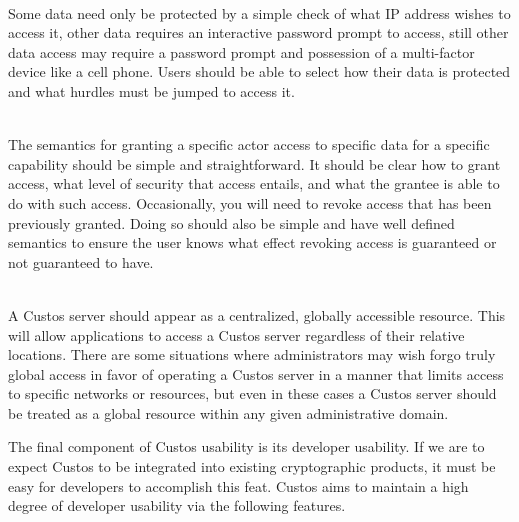 \begin{packed_desc}
\item[Flexible Authentication Mechanisms] \hfill \\ Some data need
  only be protected by a simple check of what IP address wishes to
  access it, other data requires an interactive password prompt to
  access, still other data access may require a password prompt and
  possession of a multi-factor device like a cell phone. Users should
  be able to select how their data is protected and what hurdles must
  be jumped to access it.
\item[Simple Access Control] \hfill \\ The semantics for granting a
  specific actor access to specific data for a specific capability
  should be simple and straightforward. It should be clear how to
  grant access, what level of security that access entails, and what
  the grantee is able to do with such access. Occasionally, you will
  need to revoke access that has been previously granted. Doing so
  should also be simple and have well defined semantics to ensure the
  user knows what effect revoking access is guaranteed or not
  guaranteed to have.
\item[Logical Centralization] \hfill \\ A Custos server should appear
  as a centralized, globally accessible resource. This will allow
  applications to access a Custos server regardless of their relative
  locations. There are some situations where administrators may wish
  forgo truly global access in favor of operating a Custos server in a
  manner that limits access to specific networks or resources, but
  even in these cases a Custos server should be treated as a global
  resource within any given administrative domain.
\end{packed_desc}

The final component of Custos usability is its developer usability. If
we are to expect Custos to be integrated into existing cryptographic
products, it must be easy for developers to accomplish this
feat. Custos aims to maintain a high degree of developer usability via
the following features.

